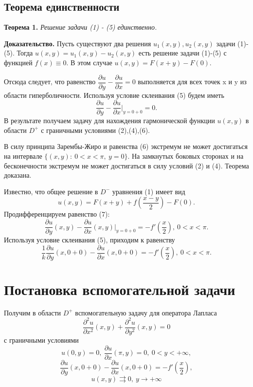 \documentclass[12pt, a4paper]{article}
\begin{document}
\subsection{Теорема единственности}
\textbf{Теорема 1.} \textit{Решение задачи (1) - (5) единственно.}

\textbf{Доказательство.} 
Пусть существуют два решения $u_1(x,y), u_2(x,y)$ задачи (1)-(5). Тогда $u(x,y) = u_1(x,y) - u_2(x,y)$ есть решение задачи (1)-(5) с функцией $f(x) \equiv 0$. В этом случае $u(x,y) = F(x+y) - F(0)$.

Отсюда следует, что равенство $\dfrac{\partial u}{\partial y} - \dfrac{\partial u}{\partial x} = 0$ выполняется для всех точек x и y из области гиперболичности. Используя условие склеивания  (5) будем иметь
\begin{equation}
	\dfrac{\partial u}{\partial y} - \dfrac{\partial u}{\partial x}\vert_{y=0+0} = 0.
\end{equation}
В результате получаем задачу для нахождения гармонической функции $u(x,y)$ в области $D^{+}$ с граничными условиями (2),(4),(6).

В силу принципа Зарембы-Жиро и равенства (6) экстремум не может достигаться на интервале $\{(x,y):\ 0 < x < \pi, \ y = 0\}$. На замкнутых боковых сторонах и на бесконечности экстремум не может достигаться в силу условий (2) и (4). Теорема доказана.

Известно, что общее решение в $D^{-}$  уравнения (1) имеет вид 
\begin{equation}
	u(x,y) = F(x+y) + f(\dfrac{x-y}{2}) - F(0).
\end{equation}
Продифференцируем равенство (7):
\begin{equation*}
	\dfrac{\partial u}{\partial y}(x,y) - \dfrac{\partial u}{\partial x}(x,y) \vert_{y=0+0} = -f'\left(\dfrac{x}2\right), \ 0 < x < \pi.
\end{equation*}
Используя условие склеивания (5), приходим к равенству
\begin{equation*}
	\dfrac{1}{k} \dfrac{\partial u}{\partial y}(x, 0+0) - \dfrac{\partial u}{\partial x}(x, 0 + 0) = - f'\left(\dfrac{x}2\right), \ 0 < x < \pi. 
\end{equation*}

\section{Постановка вспомогательной задачи}
	Получим в области $D^{+}$ вспомогательную задачу для оператора Лапласа 
\begin{equation}
	\dfrac{\partial^2 u}{\partial x^2}(x,y) + \dfrac{\partial^2 u}{\partial y^2}(x,y) = 0
\end{equation}
с граничными условиями 
\begin{equation}
	u(0,y) = 0, \ \dfrac{\partial u}{\partial x}(\pi, y) = 0, \ 0 < y < +\infty, 
\end{equation}
\begin{equation}
	\dfrac{\partial u}{\partial y}(x,0+0) - \dfrac{\partial u}{\partial x}(x,0+0) = -f'\left(\dfrac{x}{2}\right),
\end{equation}
\begin{equation}
	u(x,y) \rightrightarrows 0, \ y \to +\infty 
\end{equation}
\end{document}
